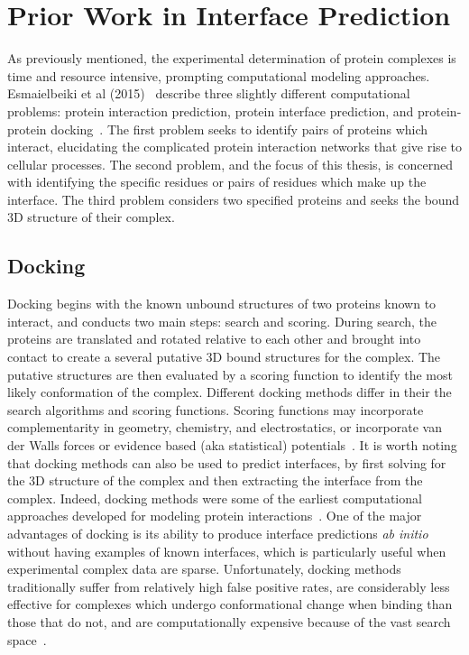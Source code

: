 
\chapter{Prior Work in Interface Prediction}
\label{chap:relatedwork} 


As previously mentioned, the experimental determination of protein complexes is time and resource intensive, prompting computational modeling approaches.
Esmaielbeiki et al (2015)~\cite{esmaielbeiki2015} describe three slightly different computational problems: protein interaction prediction, protein interface prediction, and protein-protein docking~\cite{esmaielbeiki2015}.
The first problem seeks to identify pairs of proteins which interact, elucidating the complicated protein interaction networks that give rise to cellular processes. 
The second problem, and the focus of this thesis, is concerned with identifying the specific residues or pairs of residues which make up the interface.
The third problem considers two specified proteins and seeks the bound 3D structure of their complex.

\section{Docking}

Docking begins with the known unbound structures of two proteins known to interact, and conducts two main steps: search and scoring.
During search, the proteins are translated and rotated relative to each other and brought into contact to create a several putative 3D bound structures for the complex.
The putative structures are then evaluated by a scoring function to identify the most likely conformation of the complex.
Different docking methods differ in their the search algorithms and scoring functions.
Scoring functions may incorporate complementarity in geometry, chemistry, and electrostatics, or incorporate van der Walls forces or evidence based (aka statistical) potentials~\cite{tuncbag2011}\cite{janin1995}.
It is worth noting that docking methods can also be used to predict interfaces, by first solving for the 3D structure of the complex and then extracting the interface from the complex.
Indeed, docking methods were some of the earliest computational approaches developed for modeling protein interactions~\cite{janin1995}.
One of the major advantages of docking is its ability to produce interface predictions \textit{ab initio} without having examples of known interfaces, which is particularly useful when experimental complex data are sparse.
Unfortunately, docking methods traditionally suffer from relatively high false positive rates, are considerably less effective for complexes which undergo conformational change when binding than those that do not, and are computationally expensive because of the vast search space~\cite{janin1995}\cite{tuncbag2011}.

